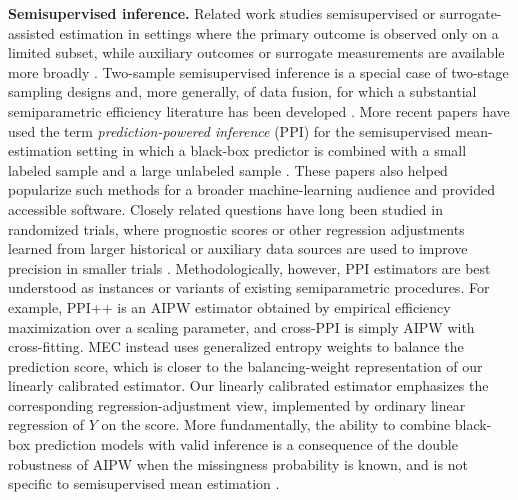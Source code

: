 \documentclass{article}
\theoremstyle{plain}
\theoremstyle{definition}
\newcommand{\1}{\mathbf{1}}
\begin{document}
\textbf{Semisupervised inference.} Related work studies semisupervised or surrogate-assisted estimation in settings where the primary outcome is observed only on a limited subset, while auxiliary outcomes or surrogate measurements are available more broadly \citep{pepe1992inference,pepe1994auxiliary,chen2000miscellanea,chen2008improving,cheng2021robust,ji2025predictions,kallus2025role}. Two-sample semisupervised inference is a special case of two-stage sampling designs \citep{scott1982effect,rose2011targeted,hejazi2021efficient,qiu2026efficient} and, more generally, of data fusion, for which a substantial semiparametric efficiency literature has been developed \citep{li2023efficient,li2025data,graham2024towards,xu2025unified}. More recent papers have used the term \emph{prediction-powered inference} (PPI) for the semisupervised mean-estimation setting in which a black-box predictor is combined with a small labeled sample and a large unlabeled sample \citep{ppi2023,angelopoulos2023ppi,crossppi2024,xu2025unified,song2026demystifying,poulet2025prediction,lee2026mec}. These papers also helped popularize such methods for a broader machine-learning audience and provided accessible software. Closely related questions have long been studied in randomized trials, where prognostic scores or other regression adjustments learned from larger historical or auxiliary data sources are used to improve precision in smaller trials \citep{hansen2008prognostic,rosenblum2009using,moore2009covariate,moore2009increasing,moore2011robust,schuler2022increasing,balzer2024adaptive,hojbjerre2025powering}. Methodologically, however, PPI estimators are best understood as instances or variants of existing semiparametric procedures. For example, PPI++ is an AIPW estimator \citep{robins1994estimation,vanderlaanunified} obtained by empirical efficiency maximization \citep{rubin2008empirical} over a scaling parameter, and cross-PPI \citep{crossppi2024} is simply AIPW with cross-fitting. MEC \citep{lee2026mec} instead uses generalized entropy weights to balance the prediction score, which is closer to the balancing-weight representation of our linearly calibrated estimator. Our linearly calibrated estimator emphasizes the corresponding regression-adjustment view, implemented by ordinary linear regression of \(Y\) on the score. More fundamentally, the ability to combine black-box prediction models with valid inference is a consequence of the double robustness of AIPW when the missingness probability is known, and is not specific to semisupervised mean estimation \citep{bang2005doubly,seaman2018introduction,rotnitzky2021characterization}.
\end{document}
